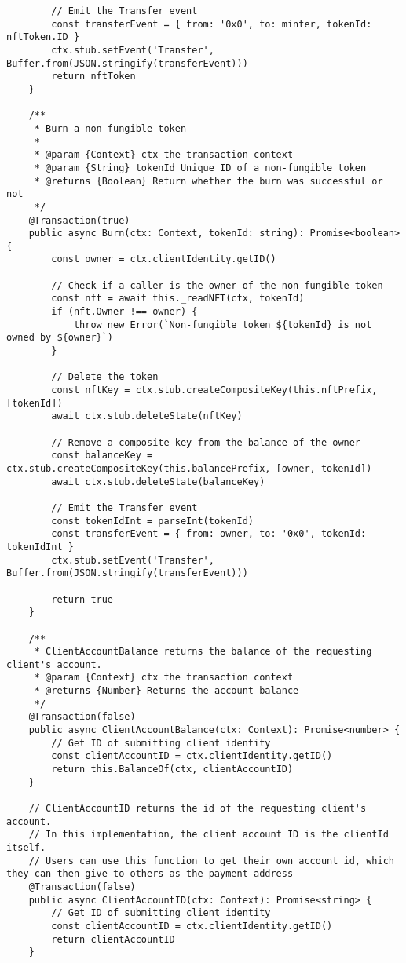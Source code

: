 \begin{lstlisting}
        // Emit the Transfer event
        const transferEvent = { from: '0x0', to: minter, tokenId: nftToken.ID }
        ctx.stub.setEvent('Transfer', Buffer.from(JSON.stringify(transferEvent)))
        return nftToken
    }

    /**
     * Burn a non-fungible token
     *
     * @param {Context} ctx the transaction context
     * @param {String} tokenId Unique ID of a non-fungible token
     * @returns {Boolean} Return whether the burn was successful or not
     */
    @Transaction(true)
    public async Burn(ctx: Context, tokenId: string): Promise<boolean> {
        const owner = ctx.clientIdentity.getID()

        // Check if a caller is the owner of the non-fungible token
        const nft = await this._readNFT(ctx, tokenId)
        if (nft.Owner !== owner) {
            throw new Error(`Non-fungible token ${tokenId} is not owned by ${owner}`)
        }

        // Delete the token
        const nftKey = ctx.stub.createCompositeKey(this.nftPrefix, [tokenId])
        await ctx.stub.deleteState(nftKey)

        // Remove a composite key from the balance of the owner
        const balanceKey = ctx.stub.createCompositeKey(this.balancePrefix, [owner, tokenId])
        await ctx.stub.deleteState(balanceKey)

        // Emit the Transfer event
        const tokenIdInt = parseInt(tokenId)
        const transferEvent = { from: owner, to: '0x0', tokenId: tokenIdInt }
        ctx.stub.setEvent('Transfer', Buffer.from(JSON.stringify(transferEvent)))

        return true
    }

    /**
     * ClientAccountBalance returns the balance of the requesting client's account.
     * @param {Context} ctx the transaction context
     * @returns {Number} Returns the account balance
     */
    @Transaction(false)
    public async ClientAccountBalance(ctx: Context): Promise<number> {
        // Get ID of submitting client identity
        const clientAccountID = ctx.clientIdentity.getID()
        return this.BalanceOf(ctx, clientAccountID)
    }

    // ClientAccountID returns the id of the requesting client's account.
    // In this implementation, the client account ID is the clientId itself.
    // Users can use this function to get their own account id, which they can then give to others as the payment address
    @Transaction(false)
    public async ClientAccountID(ctx: Context): Promise<string> {
        // Get ID of submitting client identity
        const clientAccountID = ctx.clientIdentity.getID()
        return clientAccountID
    }


\end{lstlisting}
